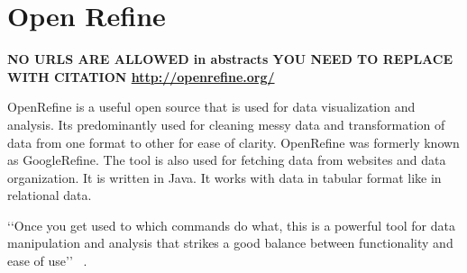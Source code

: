 \section{Open Refine}

{\bf NO URLS ARE ALLOWED in abstracts YOU NEED TO REPLACE WITH CITATION
\url{http://openrefine.org/}}

OpenRefine is a useful open source that is used for data visualization
and analysis.  Its predominantly used for cleaning messy data and
transformation of data from one format to other for ease of clarity.
OpenRefine was formerly known as GoogleRefine. The tool is also used
for fetching data from websites and data organization.
It is written in Java. It works with data in tabular format like in
relational data.

‘‘Once you get used to which commands do what, this is a powerful tool
for data manipulation and analysis that strikes a good balance between
functionality and ease of use’’ ~\cite{hid-sp18-417-openrefine}.

